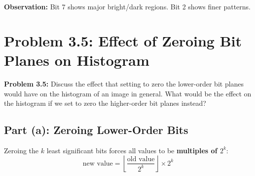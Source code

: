 \documentclass[12pt,a4paper]{article}
\begin{document}
\begin{example}
\begin{center}
\end{center}

\textbf{Observation:} Bit 7 shows major bright/dark regions. Bit 2 shows finer patterns.
\end{example}

\newpage
\section{Problem 3.5: Effect of Zeroing Bit Planes on Histogram}

\begin{questionbox}
\textbf{Problem 3.5:} Discuss the effect that setting to zero the lower-order bit planes would have on the histogram of an image in general. What would be the effect on the histogram if we set to zero the higher-order bit planes instead?
\end{questionbox}

\subsection{Part (a): Zeroing Lower-Order Bits}

\begin{conceptbox}
Zeroing the $k$ least significant bits forces all values to be \textbf{multiples of $2^k$}:
\[
\text{new value} = \left\lfloor \frac{\text{old value}}{2^k} \right\rfloor \times 2^k
\]
\end{conceptbox}
\end{document}
